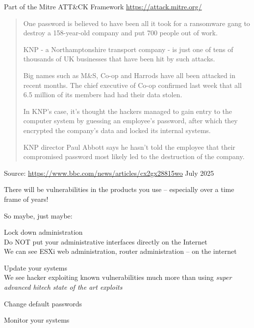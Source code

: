 \documentclass[Screen16to9,17pt]{foils}
\begin{document}
\begin{list2}
    \item Part of the Mitre ATT\&CK Framework \url{https://attack.mitre.org/}
\end{list2}




\begin{quote}
One password is believed to have been all it took for a ransomware gang to destroy a 158-year-old company and put 700 people out of work.

KNP - a Northamptonshire transport company - is just one of tens of thousands of UK businesses that have been hit by such attacks.

Big names such as M\&S, Co-op and Harrods have all been attacked in recent months. The chief executive of Co-op confirmed last week that all 6.5 million of its members had had their data stolen.

In KNP's case, it's thought the hackers managed to gain entry to the computer system by guessing an employee's password, after which they encrypted the company's data and locked its internal systems.

KNP director Paul Abbott says he hasn't told the employee that their compromised password most likely led to the destruction of the company.
\end{quote}
Source: \url{https://www.bbc.com/news/articles/cx2gx28815wo} July 2025



There will be vulnerabilities in the products you use -- especially over a time frame of years!

So maybe, just maybe:
\begin{list2}
\item Lock down administration\\
Do NOT put your administrative interfaces directly on the Internet\\
We can see ESXi web administration, router administration -- on the internet
\item Update your systems\\
We see hacker exploiting known vulnerabilities much more than using \emph{super advanced hitech state of the art exploits}
\item Change default passwords
\item Monitor your systems
\end{list2}
\end{document}
